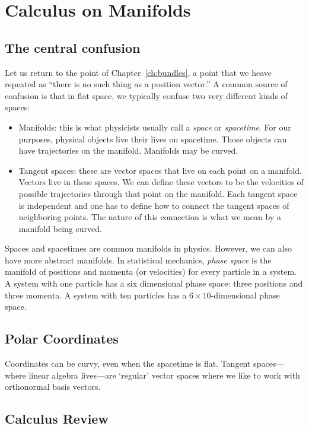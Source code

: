 \chapter{Calculus on Manifolds}


\section{The central confusion}

Let us return to the point of Chapter~\ref{ch:bundles}, a point that we heave repeated as ``there is no such thing as a position vector.'' A common source of confusion is that in flat space, we typically confuse two very different kinds of spaces:
\begin{itemize}
	\item Manifolds: this is what physicists usually call a \emph{space} or \emph{spacetime}. For our purposes, physical objects live their lives on spacetime. Those objects can have trajectories on the manifold. Manifolds may be curved.
	\item Tangent spaces: these are vector spaces that live on each point on a manifold. Vectors live in these spaces. We can define these vectors to be the velocities of possible trajectories through that point on the manifold. Each tangent space is independent and one has to define how to connect the tangent spaces of neighboring points. The nature of this connection is what we mean by a manifold being curved.
\end{itemize}
\begin{example}
Spaces and spacetimes are common manifolds in physics. However, we can also have more abstract manifolds. In statistical mechanics, \emph{phase space} is the manifold of positions and momenta (or velocities) for every particle in a system. A system with one particle has a six dimensional phase space: three positions and three momenta. A system with ten particles has a $6\times 10$-dimensional phase space. 
\end{example}


\section{Polar Coordinates}

Coordinates can be curvy, even when the spacetime is flat. Tangent spaces---where linear algebra lives---are `regular' vector spaces where we like to work with orthonormal basis vectors.

\section{Calculus Review}

